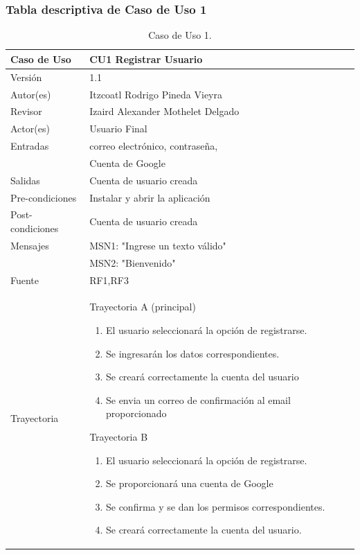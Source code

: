 \documentclass{article}
\begin{document}
\subsubsection{Tabla descriptiva de Caso de Uso 1}
\begin{table}[H]
\caption{Caso de Uso 1.}
\begin{tabular}{|M{4cm}|M{12cm}|}

\hline
Caso de Uso & CU1 Registrar Usuario\\ \hline
Versión & 1.1\\ \hline
Autor(es) & Itzcoatl Rodrigo Pineda Vieyra\\ \hline
Revisor & Izaird Alexander Mothelet Delgado \\ \hline
Actor(es) & Usuario Final \\ \hline
Entradas & correo electrónico, contraseña, \\ & Cuenta de Google \\ \hline
Salidas & Cuenta de usuario creada \\ \hline
Pre-condiciones & Instalar y abrir la aplicación \\ \hline
Post-condiciones & Cuenta de usuario creada\\ \hline
Mensajes & MSN1: "Ingrese un texto válido"\\
		 & MSN2: "Bienvenido"\\ \hline
Fuente & RF1,RF3 \\ \hline	
Trayectoria & 

Trayectoria A (principal)

\begin{enumerate}
\item El usuario seleccionará la opción de registrarse.
\item Se ingresarán los datos correspondientes.
\item Se creará correctamente la cuenta del usuario
\item Se envia un correo de confirmación al email proporcionado
\end{enumerate}

Trayectoria B

\begin{enumerate}
\item El usuario seleccionará la opción de registrarse.
\item Se proporcionará una cuenta de Google
\item Se confirma y se dan los permisos correspondientes.
\item Se creará correctamente la cuenta del usuario.
\end{enumerate}
\\ \hline
\end{tabular}
\end{table}
\end{document}
